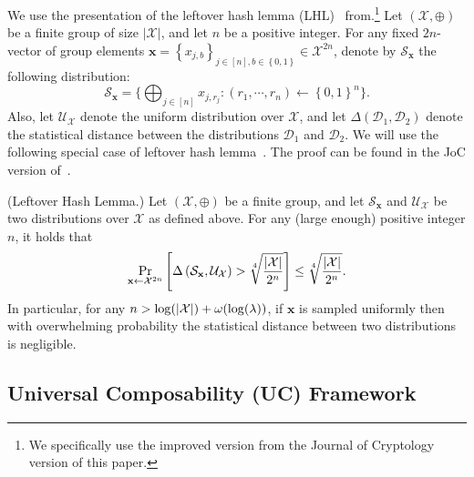 We use the presentation of the leftover hash lemma (LHL)~\cite{FOCS:ImpZuc89} from\break \cite{EC:AMPR19}.\footnote{We specifically use the improved version from the Journal of Cryptology version of this paper.}  Let $\left(\mathcal{X},\oplus\right)$ be a finite group of size $\left|\mathcal{X}\right|$, and let $n$ be a positive integer. For any fixed $2n$-vector of group elements $\mathbf{x} = \left\lbrace x_{j,b} \right\rbrace_{j\in \left[ n \right],b\in\left\lbrace 0,1 \right\rbrace} \in\mathcal{X}^{2n}$, denote by $\mathcal{S}_{\mathbf{x}}$ the following distribution:
\begin{equation}
	\mathcal{S}_{\mathbf{x}} = \Big\{\bigoplus_{j\in[n]}x_{j,r_j} : \left(r_1,\cdots,r_n\right)\gets\left\lbrace 0,1 \right\rbrace^n\Big\}.\nonumber
\end{equation}
Also, let $\mathcal{U}_{\mathcal{X}}$ denote the uniform distribution over $\mathcal{X}$, and let $\Delta \left(\mathcal{D}_1,\mathcal{D}_2\right)$ denote the statistical distance between the distributions $\mathcal{D}_1$ and $\mathcal{D}_2$. We will use the following special case of leftover hash lemma~\cite{FOCS:ImpZuc89}. The proof can be found in the JoC version of~\cite{EC:AMPR19}.

\begin{lemma}{\textnormal{(Leftover Hash Lemma.)}}
	\label{lemma:LHL}	
	Let $\left(\mathcal{X},\oplus\right)$ be a finite group, and let $\mathcal{S}_{\mathbf{x}}$ and $\mathcal{U}_{\mathcal{X}}$ be two distributions over $\mathcal{X}$ as defined above. For any (large enough) positive integer $n$, it holds that
	\begin{equation}
		\Pr_{\mathbf{x}\gets\mathcal{X}^{2n}}\left[\Delta\left(\mathcal{S}_{\mathbf{x}},\mathcal{U}_{\mathcal{X}}\right)> \sqrt[4]{\frac{\lvert \mathcal{X} \rvert}{2^n}}  \right]\leq \sqrt[4]{\frac{\lvert \mathcal{X} \rvert}{2^n}} \nonumber.
	\end{equation}
	In particular, for any $n > \log(\lvert \mathcal{X} \rvert) + \omega(\log(\lambda))$, if $\mathbf{x}$ is sampled uniformly then with overwhelming probability the statistical distance between two distributions is negligible.
\end{lemma}

\subsection{Universal Composability (UC) Framework}\label{sec:uc}

